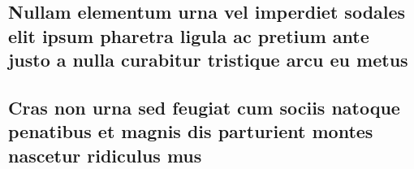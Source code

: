 \documentclass[
article,			%
11pt,				%
twoside,			%
a4paper,			%
section=TITLE,		%
onecolumn,          %
english,			%
brazil,				%
sumario=tradicional
]{abntex2}
\begin{document}
    
    
    
    \vspace{1cm}
    \begin{apendicesenv}
        
        \chapter{Nullam elementum urna vel imperdiet sodales elit ipsum pharetra ligula
            ac pretium ante justo a nulla curabitur tristique arcu eu metus}
        \lipsum[55-57]
        
    \end{apendicesenv}
    
    \vspace{1cm}
    \begin{anexosenv}
        
        \chapter{Cras non urna sed feugiat cum sociis natoque penatibus et magnis dis
            parturient montes nascetur ridiculus mus}
        
        \lipsum[31]
        
    \end{anexosenv}
\end{document}
